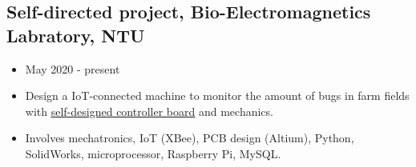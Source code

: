 \documentclass[12pt]{article}
\begin{document}
        \subsection*{Self-directed project, Bio-Electromagnetics Labratory, NTU}
        {\sffamily
        \begin{itemize}
            \item May 2020 - present
            \item Design a IoT-connected machine to monitor the amount of bugs in farm fields with \href{https://bencer3283.github.io/experiences/Iot/}{\underline{self-designed controller board}} and mechanics.
            \item Involves mechatronics, IoT (XBee), PCB design (Altium), Python, SolidWorks, microprocessor, Raspberry Pi, MySQL.
        \end{itemize}
        }
\end{document}
